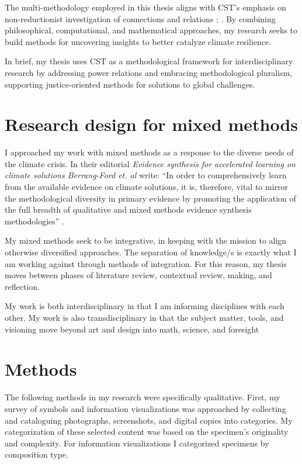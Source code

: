 The multi-methodology employed in this thesis aligns with CST's emphasis on non-reductionist investigation of connections and relations \citep[p. 144]{sevaldson_designing_2022}; \citep{midgley_systemic_2000}. By combining philosophical, computational, and mathematical approaches, my research seeks to build methods for uncovering insights to better catalyze climate resilience.

In brief, my thesis uses CST as a methodological framework for interdisciplinary research by addressing power relations and embracing methodological pluralism, supporting justice-oriented methods for solutions to global challenges.
\section{Research design for mixed methods}
I approached my work with mixed methods as a response to the diverse needs of the climate crisis. In their editorial \textit{Evidence synthesis for accelerated learning on climate solutions Berrang‐Ford et. al} write: “In order to comprehensively learn from the available evidence on climate solutions, it is, therefore, vital to mirror the methodological diversity in primary evidence by promoting the application of the full breadth of qualitative and mixed methods evidence synthesis methodologies” \citep[p. 3]{berrangford_editorial_2020}. 

My mixed methods seek to be integrative, in keeping with the mission to align otherwise diversified approaches. The separation of knowledge\slash\-s is exactly what I am working against through methods of integration. For this reason, my thesis moves between phases of literature review, contextual review, making, and reflection. 

My work is both interdisciplinary in that I am informing disciplines with each other. My work is also transdisciplinary in that the subject matter, tools, and visioning move beyond art and design into math, science, and foresight
\section{Methods}
The following methods in my research were specifically qualitative. First, my survey of symbols and information visualizations was approached by collecting and cataloguing photographs, screenshots, and digital copies into categories. My categorization of these selected content was based on the specimen’s originality and complexity. For information visualizations I categorized specimens by composition type. 

